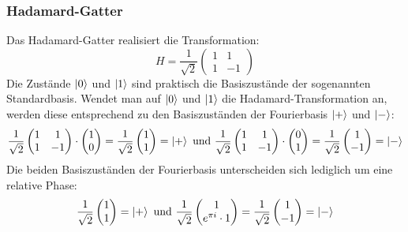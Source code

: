 \subsubsection*{Hadamard-Gatter}
Das Hadamard-Gatter realisiert die Transformation:
\[
  H 
  =
  \frac{1}{\sqrt{2}}
  \begin{pmatrix}
    1 & 1 \\
    1 & -1
    \end{pmatrix}
\]
Die Zustände \(\ket{0}\) und \(\ket{1}\) sind praktisch die Basiszustände der sogenannten Standardbasis.
Wendet man auf \(\ket{0}\) und \(\ket{1}\) die Hadamard-Transformation an, 
werden diese entsprechend zu den Basiszuständen der Fourierbasis \(\ket{+}\) und \(\ket{-}\):
\[ 
  \frac{1}{\sqrt{2}}
\begin{pmatrix}
  1 & 1 \\
  1 & -1
  \end{pmatrix}
  \cdot
  \begin{pmatrix}
    1 \\
    0
  \end{pmatrix}
  =
  \frac{1}{\sqrt{2}}
  \begin{pmatrix}
    1 \\
    1
  \end{pmatrix}
  =
  \ket{+}
  \text{ und }
  \frac{1}{\sqrt{2}}
  \begin{pmatrix}
    1 & 1 \\
    1 & -1
    \end{pmatrix}
    \cdot
    \begin{pmatrix}
      0 \\
      1
    \end{pmatrix}
    =
    \frac{1}{\sqrt{2}}
    \begin{pmatrix}
      1 \\
      -1
    \end{pmatrix}
    =
    \ket{-}
  \]
Die beiden Basiszuständen der Fourierbasis unterscheiden sich lediglich um eine relative Phase:
\[
  \frac{1}{\sqrt{2}}
  \begin{pmatrix}
    1 \\
    1
  \end{pmatrix} = 
  \ket{+}
  \text{ und }
  \frac{1}{\sqrt{2}}
  \begin{pmatrix}
    1 \\
   e^{\pi i} \cdot 1
  \end{pmatrix} = 
  \frac{1}{\sqrt{2}}
  \begin{pmatrix}
    1 \\
   - 1
  \end{pmatrix} = 
  \ket{-}
  \]

